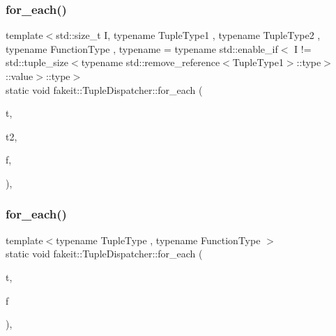 \mbox{\label{structfakeit_1_1TupleDispatcher_a42566b7faaac776dc99492e7c0b973b3}} 
\subsubsection{\texorpdfstring{for\_each()}{for\_each()}\hspace{0.1cm}{\footnotesize\ttfamily [34/54]}}
{\footnotesize\ttfamily template$<$std\+::size\+\_\+t I, typename Tuple\+Type1 , typename Tuple\+Type2 , typename Function\+Type , typename  = typename std\+::enable\+\_\+if$<$            I != std\+::tuple\+\_\+size$<$typename std\+::remove\+\_\+reference$<$\+Tuple\+Type1$>$\+::type$>$\+::value$>$\+::type$>$ \\
static void fakeit\+::\+Tuple\+Dispatcher\+::for\+\_\+each (\begin{DoxyParamCaption}\item[{Tuple\+Type1 \&\&}]{t,  }\item[{Tuple\+Type2 \&\&}]{t2,  }\item[{Function\+Type \&}]{f,  }\item[{std\+::integral\+\_\+constant$<$ size\+\_\+t, I $>$}]{ }\end{DoxyParamCaption})\hspace{0.3cm}{\ttfamily [inline]}, {\ttfamily [static]}}

\mbox{\label{structfakeit_1_1TupleDispatcher_a8fd292a71795aae0aba215dad28ee4c2}} 
\subsubsection{\texorpdfstring{for\_each()}{for\_each()}\hspace{0.1cm}{\footnotesize\ttfamily [35/54]}}
{\footnotesize\ttfamily template$<$typename Tuple\+Type , typename Function\+Type $>$ \\
static void fakeit\+::\+Tuple\+Dispatcher\+::for\+\_\+each (\begin{DoxyParamCaption}\item[{Tuple\+Type \&\&}]{t,  }\item[{Function\+Type \&}]{f }\end{DoxyParamCaption})\hspace{0.3cm}{\ttfamily [inline]}, {\ttfamily [static]}}

